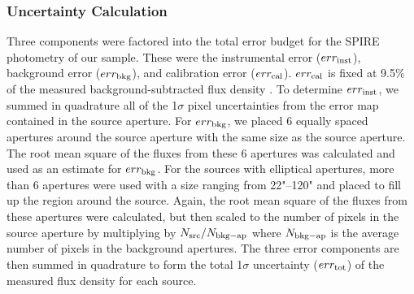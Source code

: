 \subsubsection{Uncertainty Calculation}
Three components were factored into the total error budget for the SPIRE photometry of our sample. These were the instrumental error ($err_{\rm{inst}}$), background error ($err_{\rm{bkg}}$), and calibration error ($err_{\rm{cal}}$). $err_{\rm{cal}}$ is fixed at 9.5\% of the measured background-subtracted flux density \citep{Bendo:2013sd}. To determine $err_{\rm{inst}}$, we summed in quadrature all of the 1$\sigma$ pixel uncertainties from the error map contained in the source aperture. For $err_{\rm{bkg}}$, we placed 6 equally spaced apertures around the source aperture with the same size as the source aperture. The root mean square of the fluxes from these 6 apertures was calculated and used as an estimate for $err_{\rm{bkg}}$. For the sources with elliptical apertures, more than 6 apertures were used with a size ranging from 22"--120" and placed to fill up the region around the source. Again, the root mean square of the fluxes from these apertures were calculated, but then scaled to the number of pixels in the source aperture by multiplying by $N_{\rm{src}}/{N_{\rm{bkg-ap}}}$ where $N_{\rm{bkg-ap}}$ is the average number of pixels in the background apertures. The three error components are then summed in quadrature to form the total 1$\sigma$ uncertainty ($err_{\rm{tot}}$) of the measured flux density for each source.
